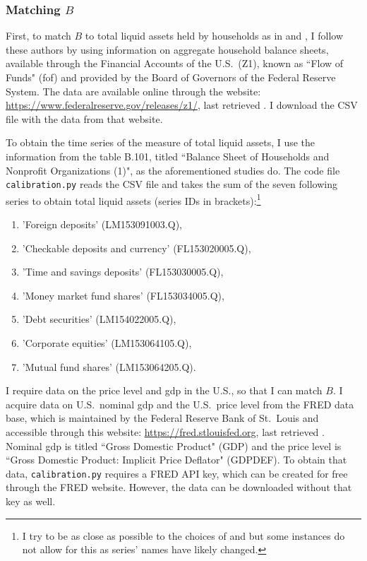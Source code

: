 \documentclass[a4paper,12pt]{article} %
\numberwithin{equation}{section} %
\numberwithin{figure}{section}
\numberwithin{table}{section}
\begin{document}
\begin{refsection}
\begin{appendices}
\subsubsection*{Matching $B$}

First, to match $B$ to total liquid assets held by households as in \textcite{mckay2016} and \textcite{gl2017}, I follow these authors by using information on aggregate household balance sheets, available through the Financial Accounts of the U.S.~(Z1), known as ``Flow of Funds" (\Gls{fof}) and provided by the Board of Governors of the Federal Reserve System. The data are available online through the website: \url{https://www.federalreserve.gov/releases/z1/}, last retrieved . I download the CSV file with the data from that website.

To obtain the time series of the measure of total liquid assets, I use the information from the table B.101, titled ``Balance Sheet of Households and Nonprofit Organizations (1)", as the aforementioned studies do. The code file \texttt{calibration.py} reads the CSV file and takes the sum of the seven following series to obtain total liquid assets (series IDs in brackets):\footnote{I try to be as close as possible to the choices of \textcite{mckay2016} and \textcite{gl2017} but some instances do not allow for this as series' names have likely changed.}
\begin{enumerate}
    \item 'Foreign deposits' (LM153091003.Q),
    \item 'Checkable deposits and currency' (FL153020005.Q),
    \item 'Time and savings deposits' (FL153030005.Q),
    \item 'Money market fund shares' (FL153034005.Q),
    \item 'Debt securities' (LM154022005.Q),
    \item 'Corporate equities' (LM153064105.Q),
    \item 'Mutual fund shares' (LM153064205.Q).
\end{enumerate}

I require data on the price level and \Gls{gdp} in the U.S., so that I can match $B$. I acquire data on U.S.~nominal \Gls{gdp} and the U.S.~price level from the FRED data base, which is maintained by the Federal Reserve Bank of St.~Louis and accessible through this website: \url{https://fred.stlouisfed.org}, last retrieved . Nominal \Gls{gdp} is titled ``Gross Domestic Product" (GDP) and the price level is ``Gross Domestic Product: Implicit Price Deflator" (GDPDEF). To obtain that data, \texttt{calibration.py} requires a FRED API key, which can be created for free through the FRED website. However, the data can be downloaded without that key as well.


\end{appendices}
\end{refsection}
\end{document}
